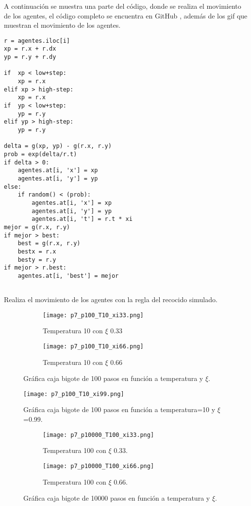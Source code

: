 \documentclass{article}
\begin{document}
A continuación se muestra una parte del código, donde se realiza el movimiento de los agentes, el código completo se encuentra en GitHub \cite{Denisse_Leyva}, además de los gif que muestran el movimiento de los agentes. 

\renewcommand{\listingscaption}{Código}
\begin{listing}[H]
  \begin{verbatim}
r = agentes.iloc[i]
xp = r.x + r.dx
yp = r.y + r.dy

if  xp < low+step:
    xp = r.x
elif xp > high-step:
    xp = r.x
if  yp < low+step:
    yp = r.y
elif yp > high-step:
    yp = r.y

delta = g(xp, yp) - g(r.x, r.y)
prob = exp(delta/r.t)
if delta > 0:
    agentes.at[i, 'x'] = xp
    agentes.at[i, 'y'] = yp
else:
    if random() < (prob):
        agentes.at[i, 'x'] = xp
        agentes.at[i, 'y'] = yp
        agentes.at[i, 't'] = r.t * xi
mejor = g(r.x, r.y)
if mejor > best:
    best = g(r.x, r.y)
    bestx = r.x
    besty = r.y
if mejor > r.best:
    agentes.at[i, 'best'] = mejor
  
    \end{verbatim}
  \label{lst:fibo}
  \caption{Realiza el movimiento de los agentes con la regla del recocido simulado.}
\end{listing}

\begin{figure}[H]
\centering
\begin{subfigure}[b]{0.40\linewidth}
\texttt{[image: p7\_p100\_T10\_xi33.png]}
\caption{Temperatura 10 con $\xi$ 0.33 }
\end{subfigure}
\begin{subfigure}[b]{0.40\linewidth}
\texttt{[image: p7\_p100\_T10\_xi66.png]}
\caption{Temperatura 10 con $\xi$ 0.66}
\end{subfigure}
\caption{Gráfica caja bigote de 100 pasos en función a temperatura y $\xi$.}
\label{fig:westminster}
\end{figure}

\begin{figure}[H]
\centering
\texttt{[image: p7\_p100\_T10\_xi99.png]}
\caption{\label{fig3} Gráfica caja bigote de 100 pasos en función a temperatura=10 y $\xi$=0.99.}
\end{figure}

\begin{figure}[H]
\centering
\begin{subfigure}[b]{0.40\linewidth}
\texttt{[image: p7\_p10000\_T100\_xi33.png]}
\caption{Temperatura 100 con $\xi$ 0.33.}
\end{subfigure}
\begin{subfigure}[b]{0.40\linewidth}
\texttt{[image: p7\_p10000\_T100\_xi66.png]}
\caption{Temperatura 100 con $\xi$ 0.66.}
\end{subfigure}
\caption{Gráfica caja bigote de 10000 pasos en función a temperatura y $\xi$.}
\label{fig:westminster}
\end{figure}
\end{document}
